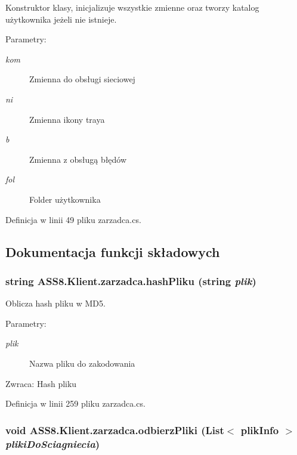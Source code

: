 Konstruktor klasy, inicjalizuje wszystkie zmienne oraz tworzy katalog użytkownika jeżeli nie istnieje. 

\begin{Desc}
\item[Parametry:]
\begin{description}
\item[{\em kom}]Zmienna do obsługi sieciowej\item[{\em ni}]Zmienna ikony traya\item[{\em b}]Zmienna z obsługą błędów\item[{\em fol}]Folder użytkownika\end{description}
\end{Desc}


Definicja w linii 49 pliku zarzadca.cs.

\subsection{Dokumentacja funkcji składowych}
\hypertarget{a00037_565af80b3fd64edae29abc5210555614}{
\subsubsection[{hashPliku}]{\setlength{\rightskip}{0pt plus 5cm}string ASS8.Klient.zarzadca.hashPliku (string {\em plik})}}
\label{d1/dc6/a00037_565af80b3fd64edae29abc5210555614}


Oblicza hash pliku w MD5. 

\begin{Desc}
\item[Parametry:]
\begin{description}
\item[{\em plik}]Nazwa pliku do zakodowania\end{description}
\end{Desc}
\begin{Desc}
\item[Zwraca:]Hash pliku\end{Desc}


Definicja w linii 259 pliku zarzadca.cs.\hypertarget{a00037_c6dbb2e2034a04a7abf666b24b419b6b}{
\subsubsection[{odbierzPliki}]{\setlength{\rightskip}{0pt plus 5cm}void ASS8.Klient.zarzadca.odbierzPliki (List$<$ {\bf plikInfo} $>$ {\em plikiDoSciagniecia})}}
\label{d1/dc6/a00037_c6dbb2e2034a04a7abf666b24b419b6b}


